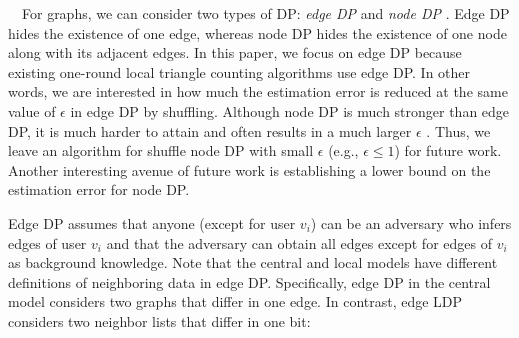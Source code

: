 
\smallskip
{}~~For graphs, we can consider two types of DP: 
\textit{edge DP} and \textit{node DP} \cite{Hay_ICDM09,Raskhodnikova_Encyclopedia16}. 
Edge DP hides the existence of one edge, whereas node DP hides the existence of one node along with its adjacent edges. 
In this paper, we focus on edge DP because existing one-round local triangle counting algorithms \cite{Imola_USENIX21,Imola_USENIX22,Ye_ICDE20,Ye_TKDE21} use edge DP. 
In other words, we are interested in 
how much the estimation error is reduced at the same value of $\epsilon$ in edge DP by shuffling. 
Although node DP is much stronger than edge DP, it is much harder to attain and often results in a much larger $\epsilon$ \cite{Chen_SIGMOD13,Sajadmanesh_arXiv22}. 
Thus, we leave an algorithm for shuffle node DP with small $\epsilon$ (e.g., $\epsilon \leq 1$) for future work. 
Another interesting avenue of future work is establishing a lower bound on the estimation error for node DP. 

Edge DP assumes that anyone (except for user $v_i$) can be an adversary who infers edges of user $v_i$ and that the adversary can obtain all edges except for edges of $v_i$ as background knowledge. 
Note that the central and local models have different definitions of neighboring data in edge DP. 
Specifically, edge DP in the central model \cite{Raskhodnikova_Encyclopedia16} considers two graphs that differ in one edge. 
In contrast, edge LDP 
\cite{qin2017generating} considers two neighbor lists that differ in one bit: 

